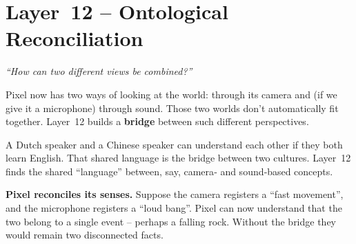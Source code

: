 \section{Layer~12 – Ontological Reconciliation}
\label{sec:layer12}

\begin{tcolorbox}[colback=blue!5, colframe=blue!60, title=\textbf{Superpower: The Bridge‑Builder}]
\begin{center}
\textit{“How can two different views be combined?”}
\end{center}
\end{tcolorbox}

Pixel now has two ways of looking at the world: through its camera
and (if we give it a microphone) through sound.  Those two worlds
don’t automatically fit together.  Layer~12 builds a \textbf{bridge}
between such different perspectives.

\begin{tcolorbox}[colback=yellow!5, colframe=yellow!80, title=Real‑life analogy]
A Dutch speaker and a Chinese speaker can understand each other if they
both learn English.  That shared language is the bridge between two
cultures.  Layer~12 finds the shared “language” between, say, camera‑
and sound‑based concepts.
\end{tcolorbox}

\textbf{Pixel reconciles its senses.}
Suppose the camera registers a “fast movement”, and the microphone
registers a “loud bang”.  Pixel can now understand that the two belong
to a single event – perhaps a falling rock.  Without the bridge they
would remain two disconnected facts.